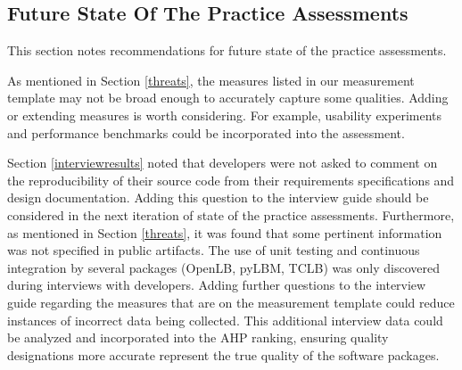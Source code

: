 \documentclass[12pt, notitlepage]{article}
\begin{document}
\subsection{Future State Of The Practice Assessments}\label{futuresop}

This section notes recommendations for future state of the practice assessments.  

As mentioned in Section \ref{threats}, the measures listed in our measurement template may not be broad enough to accurately capture some qualities. Adding or extending measures is worth considering. For example, usability experiments and performance benchmarks could be incorporated into the assessment.

Section \ref{interviewresults} noted that developers were not asked to comment on the reproducibility of their source code from their requirements specifications and design documentation. Adding this question to the interview guide should be considered in the next iteration of state of the practice assessments. Furthermore, as mentioned in Section \ref{threats}, it was found that some pertinent information was not specified in public artifacts. The use of unit testing and continuous integration by several packages (OpenLB, pyLBM, TCLB) was only discovered during interviews with developers. Adding further questions to the interview guide regarding the measures that are on the measurement template could reduce instances of incorrect data being collected. This additional interview data could be analyzed and incorporated into the AHP ranking, ensuring quality designations more accurate represent the true quality of the software packages.
\end{document}
